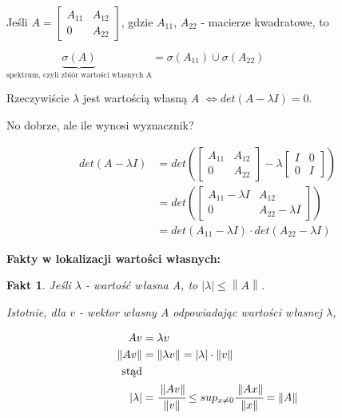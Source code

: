 \documentclass[hidelinks,a4paper]{article}
\newcommand{\norm}[1]{\left\lVert#1\right\rVert}
\newtheorem{fakt}{Fakt}
\begin{document}
Jeśli $A = \left[\begin{array}{c|c}A_{11} & A_{12} \\ \hline 0 & A_{22}\end{array}\right]$, gdzie $A_{11}$, $A_{22}$ - macierze kwadratowe, to

$\underbrace{\sigma(A)}_{\textrm{spektrum, czyli zbiór wartości własnych A}} = \sigma(A_{11}) \cup \sigma(A_{22})$

Rzeczywiście $\lambda$ jest wartością własną $A$ $\iff det(A -\lambda I) = 0$.

No dobrze, ale ile wynosi wyznacznik?

\begin{equation}
	\begin{aligned}
		det(A - \lambda I) & = det\left( \left[\begin{array}{c|c}A_{11} & A_{12} \\ \hline 0 & A_{22}\end{array}\right] - \lambda  \left[\begin{array}{c|c}I & 0 \\ \hline 0 & I\end{array}\right] \right) \\
		& = det\left( \left[\begin{array}{c|c}A_{11}-\lambda I & A_{12} \\ \hline 0 & A_{22} - \lambda I\end{array}\right]\right) \\
		& = det(A_{11} - \lambda I) \cdot det(A_{22} - \lambda I)
	\end{aligned}
\end{equation}

\textbf{Fakty w lokalizacji wartości własnych:}

\begin{fakt}
	Jeśli $\lambda$ - wartość własna A, to $|\lambda| \leq \norm{A}$.
		
	Istotnie, dla $v$ - wektor własny A odpowiadając wartości własnej $\lambda$,
		
	\begin{equation}
		\begin{aligned}
			Av             & =\lambda v                                                                                   \\
			\norm{A v}    & = \norm{\lambda v} = |\lambda| \cdot \norm{v}                                              \\
			\textrm{stąd} &                                                                                              \\
			|\lambda|      & = \cfrac{\norm{A v}}{\norm{v}} \leq sup_{x \neq 0} \cfrac{\norm{Ax}}{\norm{x}} = \norm{A} 
		\end{aligned}
	\end{equation}
		
\end{fakt}
\end{document}
